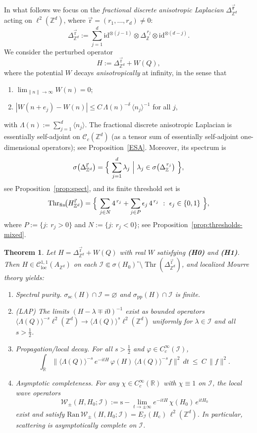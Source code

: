 \documentclass[10pt]{amsart} %
\newcommand{\R}{{\mathbb{R}}}
\newcommand{\Z}{{\mathbb{Z}}}
\newcommand{\1}{{\mathbb{I}}}
\newcommand{\Cc}{\mathcal{C}}
\newcommand{\Ic}{\mathcal{I}}
\newcommand{\Wc}{\mathcal{W}}
\newcommand{\Thr}{\operatorname{Thr}}
\numberwithin{equation}{section}
\newtheorem{theorem}{Theorem}[section]%
\begin{document}
In what follows we focus on the \emph{fractional discrete anisotropic Laplacian}
$\Delta^{\vec{\mathbf r}}_{\Z^d}$ acting on $\ell^2(\Z^d)$, where $\vec{\mathrm{r}}=(r_1,\dots,r_d)\neq0$:
\[
\Delta^{\vec{\mathrm{r}}}_{\Z^d}
:=\sum_{j=1}^d\mathrm{id}^{\otimes(j-1)}\otimes\Delta_{\Z}^{\,r_j}\otimes\mathrm{id}^{\otimes(d-j)}.
\]
We consider the perturbed operator
\[
H:=\Delta^{\vec{\mathrm{r}}}_{\Z^d}+W(Q),
\]
where the potential $W$ decays \emph{anisotropically} at infinity, in the sense that
\begin{enumerate}
\item[\textbf{(H0)}] $\lim_{\|n\|\to\infty}W(n)=0$;
\item[\textbf{(H1)}] $|W(n+e_j)-W(n)|\le C\,\Lambda(n)^{-\delta}\,\langle n_j\rangle^{-1}$ for all $j$,
\end{enumerate}
with $\Lambda(n):=\sum_{j=1}^d\langle n_j\rangle$.
The fractional discrete anisotropic Laplacian is essentially self-adjoint on $\Cc_c(\Z^d)$
(as a tensor sum of essentially self-adjoint one-dimensional operators); see Proposition~\ref{ESA}.
Moreover, its spectrum is
\[
\sigma\!\left(\Delta_{\Z^d}^{\vec{\mathrm{r}}}\right)
=\Bigl\{\ \sum_{j=1}^d\lambda_j\ \Big|\ \lambda_j\in\sigma\!\left(\Delta_{\Z}^{\,r_j}\right)\ \Bigr\},
\]
see Proposition~\ref{prop:spect}, and its finite threshold set is
\[
\Thr_{\mathrm{fin}}\!\bigl(H_{\Z^d}^{\vec{\mathrm{r}}}\bigr)
=\Bigl\{\ \sum_{j\in N}4^{\,r_j}+\sum_{j\in P}\epsilon_j\,4^{\,r_j}\ :\ \epsilon_j\in\{0,1\}\ \Bigr\},
\]
where $P:=\{j:\ r_j>0\}$ and $N:=\{j:\ r_j<0\}$; see Proposition~\ref{prop:thresholds-mixed}.

\begin{theorem}\label{thm:main}
Let $H=\Delta_{\Z^d}^{\vec{\mathrm r}}+W(Q)$ with real $W$ satisfying \textbf{(H0)} and \textbf{(H1)}.
Then $H\in\mathcal{C}^{1,1}_{\mathrm{loc}}(A_{\Z^d})$ on each
$\Ic\Subset\sigma(H_0)^\circ\setminus\Thr(\Delta_{\Z^d}^{\vec{\mathrm{r}}})$,
and localized Mourre theory yields:
\begin{enumerate} \renewcommand{\labelenumi}{\roman{enumi})}
\item \emph{Spectral purity.} $\sigma_{\mathrm{sc}}(H)\cap\Ic=\varnothing$ and $\sigma_{\mathrm{pp}}(H)\cap\Ic$ is finite.
\item \emph{(LAP)} The limits $(H-\lambda\mp i0)^{-1}$ exist as bounded operators
$\langle\Lambda(Q)\rangle^{-s}\ell^2(\Z^d)\to\langle\Lambda(Q)\rangle^{s}\ell^2(\Z^d)$
uniformly for $\lambda\in\Ic$ and all $s>\tfrac12$.
\item \emph{Propagation/local decay.} For all $s>\tfrac12$ and $\varphi\in C_c^\infty(\Ic)$,
\[
\int_{\R}\big\|\langle\Lambda(Q)\rangle^{-s}\,e^{-itH}\,\varphi(H)\,\langle\Lambda(Q)\rangle^{-s}f\big\|^2\,dt
\ \le\ C\,\|f\|^2.
\]
\item \emph{Asymptotic completeness.} For any $\chi\in C_c^\infty(\R)$ with $\chi\equiv1$ on $\Ic$, the local wave operators
\[
\Wc_\pm(H,H_0;\Ic):=\mathrm{s}\!-\!\lim_{t\to\pm\infty}e^{-itH}\,\chi(H_0)\,e^{itH_0}
\]
exist and satisfy $\mathrm{Ran}\,\Wc_\pm(H,H_0;\Ic)=E_\Ic(H_{\mathrm c})\,\ell^2(\Z^d)$.
In particular, scattering is asymptotically complete on $\Ic$.
\end{enumerate}
\end{theorem}
\end{document}
